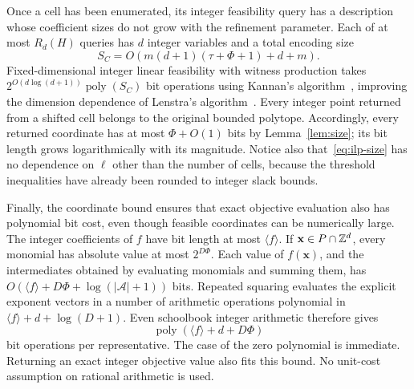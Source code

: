 \documentclass[11pt]{article}
\theoremstyle{definition}\newtheorem{definition}{Definition}[section]
\theoremstyle{remark}\newtheorem{remark}[theorem]{Remark}
\newcommand{\poly}{\operatorname{poly}}
\begin{document}
Once a cell has been enumerated, its integer feasibility query has a description whose coefficient sizes do not grow with the refinement parameter.
Each of at most $R_d(H)$ queries has $d$ integer variables and a total encoding size
\begin{equation}\label{eq:ilp-size}
 S_C=O\!\left(m(d+1)(\tau+\Phi+1)+d+m\right).
\end{equation}
Fixed-dimensional integer linear feasibility with witness production takes $2^{O(d\log(d+1))}\poly(S_C)$ bit operations using Kannan's algorithm~\cite{Kannan}, improving the dimension dependence of Lenstra's algorithm~\cite{Lenstra}. Every integer point returned from a shifted cell belongs to the original bounded polytope. Accordingly, every returned coordinate has at most $\Phi+O(1)$ bits by Lemma~\ref{lem:size}; its bit length grows logarithmically with its magnitude. Notice also that~\eqref{eq:ilp-size} has no dependence on $\ell$ other than the number of cells, because the threshold inequalities have already been rounded to integer slack bounds.

Finally, the coordinate bound ensures that exact objective evaluation also has polynomial bit cost, even though feasible coordinates can be numerically large.
The integer coefficients of $f$ have bit length at most $\langle f\rangle$. If $\mathbf{x}\in P\cap\mathbb Z^d$, every monomial has absolute value at most $2^{D\Phi}$. Each value of $f(\mathbf{x})$, and the intermediates obtained by evaluating monomials and summing them, has $O(\langle f\rangle+D\Phi+\log(|\mathcal A|+1))$ bits. Repeated squaring evaluates the explicit exponent vectors in a number of arithmetic operations polynomial in $\langle f\rangle+d+\log(D+1)$. Even schoolbook integer arithmetic therefore gives
\begin{equation}\label{eq:eval}
 \poly(\langle f\rangle+d+D\Phi)
\end{equation}
bit operations per representative. The case of the zero polynomial is immediate. Returning an exact integer objective value also fits this bound. No unit-cost assumption on rational arithmetic is used.
\end{document}
